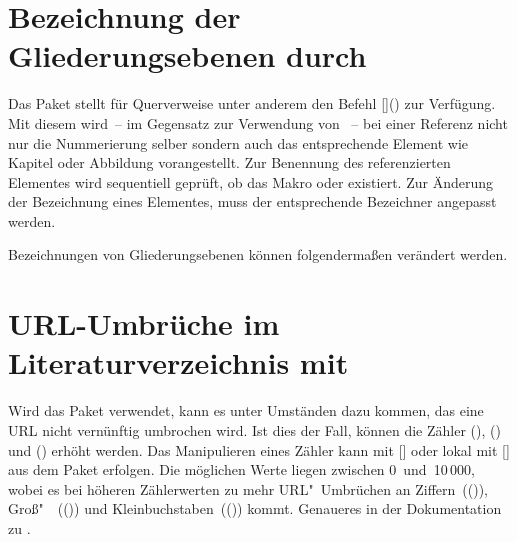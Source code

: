 \section{Bezeichnung der Gliederungsebenen durch }
%
%
Das Paket  stellt für Querverweise unter anderem den Befehl 
[]() zur Verfügung. Mit 
diesem wird~-- im Gegensatz zur Verwendung von ~-- bei einer 
Referenz nicht nur die Nummerierung selber sondern auch das entsprechende 
Element wie Kapitel oder Abbildung vorangestellt. Zur Benennung des 
referenzierten Elementes wird sequentiell geprüft, ob das Makro 
 oder  
existiert. Zur Änderung der Bezeichnung eines Elementes, muss der entsprechende 
Bezeichner angepasst werden.
%
\begin{Example}
Bezeichnungen von Gliederungsebenen können folgendermaßen verändert werden.
\begin{Code}
\end{Code}
\end{Example}



\section{URL-Umbrüche im Literaturverzeichnis mit }
%
%
Wird das Paket  verwendet, kann es unter Umständen dazu 
kommen, das eine URL nicht vernünftig umbrochen wird. Ist dies der Fall, 
können die Zähler (), 
() und 
() erhöht werden. Das Manipulieren 
eines Zähler kann mit [] oder lokal mit 
[] aus dem Paket  
erfolgen. Die möglichen Werte liegen zwischen 0~und~10\,000, wobei es bei 
höheren Zählerwerten zu mehr URL"~Umbrüchen an 
Ziffern~(()), 
Groß"~~(()) und 
Kleinbuchstaben~(()) kommt. 
Genaueres in der Dokumentation zu .



